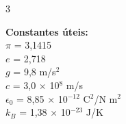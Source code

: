 \documentclass[a4paper,landscape]{article}
\begin{document}
\begin{multicols}{3}

\textbf{Constantes úteis:} \\
$\pi$ = 3,1415 \\
$e$ = 2,718 \\
$g$ = 9,8 m/s$^2$ \\
$c$ = 3,0 $\times$ 10$^8$ m/s \\
$\epsilon_0$ = 8,85 $\times$ 10$^{-12}$ C$^2$/N m$^2$ \\
$k_B$ = 1,38 $\times$ 10$^{-23}$ J/K \\

\end{multicols}
\end{document}
